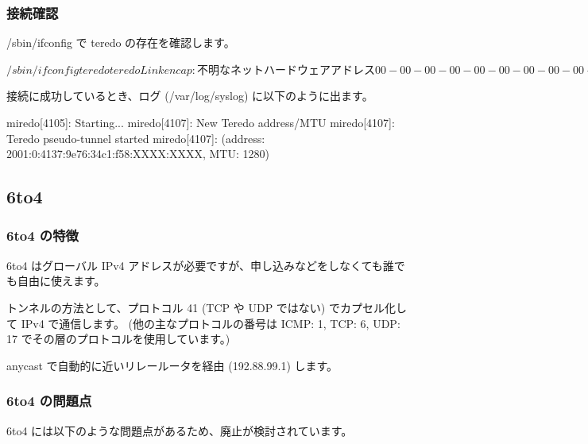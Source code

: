 \documentclass[mingoth,a4paper]{jsarticle}
\begin{document}
\subsubsection{接続確認}

/sbin/ifconfig で teredo の存在を確認します。

\begin{commandline}
$ /sbin/ifconfig teredo
teredo    Link encap:不明なネット  ハードウェアアドレス 00-00-00-00-00-00-00-00-00-00-00-00-00-00-00-00
          inet6アドレス: fe80::ffff:ffff:ffff/64 範囲:リンク
          inet6アドレス: 2001:0:4137:9e76:34c1:f58:XXXX:XXXX/32 範囲:グローバル
          UP POINTOPOINT RUNNING NOARP MULTICAST  MTU:1280  メトリック:1
          RXパケット:0 エラー:0 損失:0 オーバラン:0 フレーム:0
          TXパケット:3 エラー:0 損失:0 オーバラン:0 キャリア:0
      衝突(Collisions):0 TXキュー長:500
          RXバイト:0 (0.0 B)  TXバイト:144 (144.0 B)
$
\end{commandline}

接続に成功しているとき、ログ (/var/log/syslog) に以下のように出ます。

\begin{commandline}
miredo[4105]: Starting...
miredo[4107]: New Teredo address/MTU
miredo[4107]: Teredo pseudo-tunnel started
miredo[4107]:  (address: 2001:0:4137:9e76:34c1:f58:XXXX:XXXX, MTU: 1280)
\end{commandline}
\subsection{6to4}
\subsubsection{6to4 の特徴}


6to4 はグローバル IPv4 アドレスが必要ですが、申し込みなどをしなくても誰でも自由に使えます。

トンネルの方法として、プロトコル 41 (TCP や UDP ではない) でカプセル化して IPv4 で通信します。
(他の主なプロトコルの番号は ICMP: 1, TCP: 6, UDP: 17 でその層のプロトコルを使用しています。)

anycast で自動的に近いリレールータを経由 (192.88.99.1) します。
\subsubsection{6to4 の問題点}

6to4 には以下のような問題点があるため、廃止が検討されています。
\end{document}
